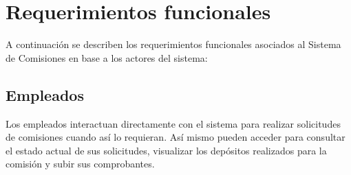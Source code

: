 \section{Requerimientos funcionales}

A continuación se describen los requerimientos funcionales asociados al Sistema de Comisiones en base a los actores del sistema:

\subsection{Empleados}

Los empleados interactuan directamente con el sistema para realizar solicitudes de comisiones cuando así lo requieran. Así mismo pueden acceder para consultar el estado actual de sus solicitudes, visualizar los depósitos realizados para la comisión y subir sus comprobantes. 

